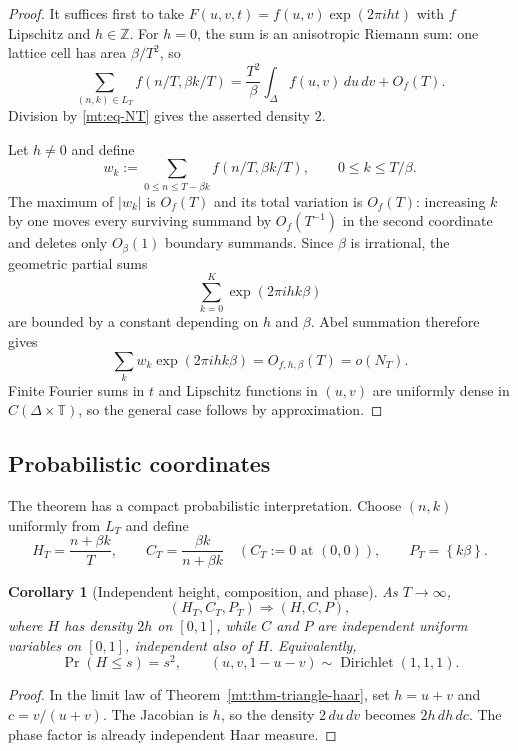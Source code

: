 \documentclass[11pt,oneside]{article}
\newtheorem{corollary}[theorem]{Corollary}
\theoremstyle{definition}
\theoremstyle{remark}
\newcommand{\Z}{\mathbb Z}
\newcommand{\Torus}{\mathbb T}
\newcommand{\fract}[1]{\left\{#1\right\}}
\begin{document}
\begin{proof}
It suffices first to take
$F(u,v,t)=f(u,v)\exp(2\pi iht)$ with $f$ Lipschitz and $h\in\Z$.  For $h=0$, the sum is an
anisotropic Riemann sum: one lattice cell has area $\beta/T^2$, so
\[
  \sum_{(n,k)\in L_T}f(n/T,\beta k/T)
  =\frac{T^2}{\beta}\int_\Delta f(u,v)\,du\,dv+O_f(T).
\]
Division by \eqref{mt:eq-NT} gives the asserted density $2$.

Let $h\ne0$ and define
\[
  w_k:=\sum_{0\le n\le T-\beta k}f(n/T,\beta k/T),
  \qquad 0\le k\le T/\beta.
\]
The maximum of $|w_k|$ is $O_f(T)$ and its total variation is $O_f(T)$: increasing $k$ by one
moves every surviving summand by $O_f(T^{-1})$ in the second coordinate and deletes only
$O_\beta(1)$ boundary summands.  Since $\beta$ is irrational, the geometric partial sums
\[
  \sum_{k=0}^{K}\exp(2\pi ihk\beta)
\]
are bounded by a constant depending on $h$ and $\beta$.  Abel summation therefore gives
\[
  \sum_k w_k\exp(2\pi ihk\beta)=O_{f,h,\beta}(T)=o(N_T).
\]
Finite Fourier sums in $t$ and Lipschitz functions in $(u,v)$ are uniformly dense in
$C(\Delta\times\Torus)$, so the general case follows by approximation.
\end{proof}

\subsection{Probabilistic coordinates}

The theorem has a compact probabilistic interpretation.  Choose $(n,k)$ uniformly from $L_T$
and define
\begin{equation}
  H_T=\frac{n+\beta k}{T},
  \qquad
  C_T=\frac{\beta k}{n+\beta k}
  \quad (C_T:=0\text{ at }(0,0)),
  \qquad
  P_T=\fract{k\beta}.
  \label{mt:eq-prob-coords}
\end{equation}

\begin{corollary}[Independent height, composition, and phase]
\label{mt:cor-beta-uniform}
As $T\to\infty$,
\[
  (H_T,C_T,P_T)\Longrightarrow(H,C,P),
\]
where $H$ has density $2h$ on $[0,1]$, while $C$ and $P$ are independent uniform variables on
$[0,1]$, independent also of $H$.  Equivalently,
\[
  \Pr(H\le s)=s^2,
  \qquad
  (u,v,1-u-v)\sim\operatorname{Dirichlet}(1,1,1).
\]
\end{corollary}

\begin{proof}
In the limit law of Theorem~\ref{mt:thm-triangle-haar}, set $h=u+v$ and $c=v/(u+v)$.  The
Jacobian is $h$, so the density $2\,du\,dv$ becomes $2h\,dh\,dc$.  The phase factor is already
independent Haar measure.
\end{proof}
\end{document}
